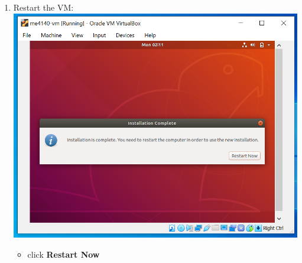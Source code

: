 \documentclass[12pt]{article}
\begin{document}
\begin{description}
\begin{description}
\begin{enumerate}
\vspace{5mm} 
\item Restart the VM: \vspace{5mm} \\
	\hspace*{-2.5cm}\includegraphics[scale=.6]{Capture21.png}  
    \begin{itemize}
        \item click {\bf Restart Now}
    \end{itemize}        

\newpage  


\end{enumerate}
\end{description}
\end{description}
\end{document}
